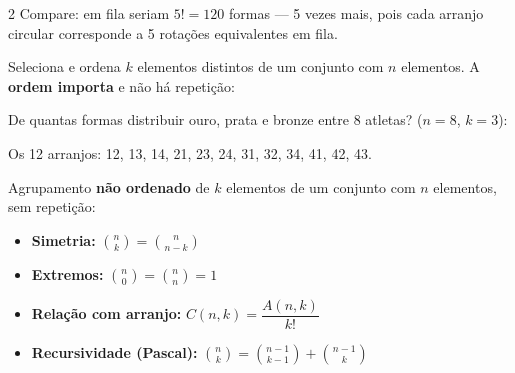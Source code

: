 \documentclass[12pt]{article}
\begin{document}
\begin{multicols}{2}
Compare: em fila seriam $5! = 120$ formas — 5 vezes mais, pois cada
arranjo circular corresponde a 5 rotações equivalentes em fila.



Seleciona e ordena $k$ elementos distintos de um conjunto com $n$
elementos. A \textbf{ordem importa} e não há repetição:




De quantas formas distribuir ouro, prata e bronze entre 8 atletas?
($n=8$, $k=3$):




Os 12 arranjos: 12, 13, 14, 21, 23, 24, 31, 32, 34, 41, 42, 43.


Agrupamento \textbf{não ordenado} de $k$ elementos de um conjunto com
$n$ elementos, sem repetição:



\begin{itemize}
  \item \textbf{Simetria:} $\binom{n}{k} = \binom{n}{n-k}$
  \item \textbf{Extremos:} $\binom{n}{0} = \binom{n}{n} = 1$
  \item \textbf{Relação com arranjo:} $C(n,k) = \dfrac{A(n,k)}{k!}$
  \item \textbf{Recursividade (Pascal):} $\binom{n}{k} = \binom{n-1}{k-1} + \binom{n-1}{k}$
\end{itemize}


\end{multicols}
\end{document}
